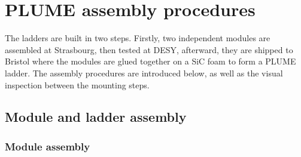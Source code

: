 
 
 \minitoc
  

\section{PLUME assembly procedures}

  The ladders are built in two steps. 
  Firstly, two independent modules are assembled at Strasbourg, then tested at DESY, afterward, they are shipped to Bristol where the modules are glued together on a \gls{SiC} foam to form a \gls{PLUME} ladder.
  The assembly procedures are introduced below, as well as the visual inspection between the mounting steps.

  \subsection{Module and ladder assembly}

    \subsubsection{Module assembly}
    \label{subsec:modAssembly}

